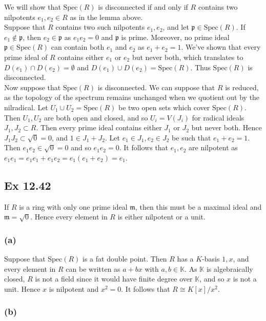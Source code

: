 \documentclass{article}
\theoremstyle{definition}
\newcommand{\K}{\mathbb{K}}
\newcommand{\Spec}{\text{Spec}}
\begin{document}
We will show that $\Spec(R)$ is disconnected if and only if $R$ contains two nilpotents 
$e_1, e_2 \in R$ as in the lemma above. \\

Suppose that $R$ contains two such nilpotents $e_1, e_2$, and let $\mathfrak{p}
\in \Spec(R)$. If $e_1 \not \in \mathfrak{p}$, then $e_2 \in \mathfrak{p}$ as
$e_1e_2 = 0$ and $\mathfrak{p}$ is prime. Moreover, no prime ideal
$\mathfrak{p} \in \Spec(R)$ can contain both $e_1$ and $e_2$ as $e_1 + e_2 =
1$. We've shown that every prime ideal of $R$ contains either $e_1$ or $e_2$
but never both, which translates to $D(e_1) \cap D(e_2) = \emptyset$ and
$D(e_1) \cup D(e_2) = \Spec(R)$. Thus $\Spec(R)$ is disconnected. \\

Now suppose that $\Spec(R)$ is disconnected. We can suppose that $R$ is
reduced, as the topology of the spectrum remains unchanged when we quotient out
by the nilradical. Let $U_1 \cup U_2 = \Spec(R)$ be two open sets which cover
$\Spec(R)$. Then $U_1, U_2$ are both open and closed, and so $U_i = V(J_i)$ for
radical ideals $J_1, J_2 \subset R$. Then every prime ideal contains either
$J_1$ or $J_2$ but never both. Hence $J_1J_2 \subset \sqrt{0} = 0$, and $1 \in
J_1 + J_2$. Let $e_1 \in J_1, e_2 \in J_2$ be such that $e_1 + e_2 = 1$. Then
$e_1e_2 \in \sqrt{0} = 0$ and so $e_1e_2 = 0$. It follows that $e_1, e_2$ are
nilpotent as $e_1e_1 = e_1e_1 + e_1e_2 = e_1(e_1 + e_2) = e_1$.


\subsection*{Ex 12.42}

If $R$ is a ring with only one prime ideal $\mathfrak{m}$, then this must be a
maximal ideal and $\mathfrak{m} = \sqrt{0}$. Hence every element in $R$ is
either nilpotent or a unit.

\subsubsection*{(a)}
Suppose that $\Spec(R)$ is a fat double point. Then $R$ has a $K$-basis $1, x$,
and every element in $R$ can be written as $a + bx$ with $a, b \in \K$. As $\K$
is algebraically closed, $R$ is not a field since it would have finite degree
over $\K$, and so $x$ is not a unit. Hence $x$ is nilpotent and $x^2 = 0$. It
follows that $R \cong K[x]/x^2$.

\subsubsection*{(b)}
\end{document}
